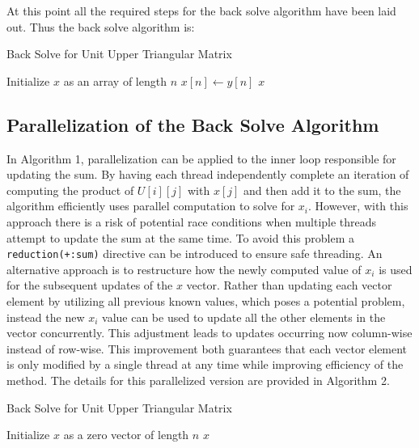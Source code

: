 \documentclass{article}
\begin{document}
\bigskip
\noindent
At this point all the required steps for the back solve algorithm have been laid out. Thus the back solve algorithm is:

\begin{algorithm}[hbt!]
\caption{Back Solve for Unit Upper Triangular Matrix}
\label{algo:back_substitution}
\SetAlgoLined
{}
Initialize $x$ as an array of length $n$\;
$x[n] \gets y[n]$ \;
\Return $x$\;
\end{algorithm}

\subsection{Parallelization of the Back Solve Algorithm}
In Algorithm 1, parallelization can be applied to the inner loop responsible for updating the sum. By having each thread independently complete an iteration of computing the product of \( U[i][j]\) with $x[j]$ and then add it to the sum, the algorithm efficiently uses parallel computation to solve for $x_{i}$. However, with this approach there is a risk of potential race conditions when multiple threads attempt to update the sum at the same time. To avoid this problem a \texttt{reduction(+:sum)} directive can be introduced to ensure safe threading. An alternative approach is to restructure how the newly computed value of $x_{i}$ is used for the subsequent updates of the \(x\) vector. Rather than updating each vector element by utilizing all previous known values, which poses a potential problem, instead the new $x_{i}$ value can be used to update all the other elements in the vector concurrently. This adjustment leads to updates occurring now column-wise instead of row-wise. This improvement both guarantees that each vector element is only modified by a single thread at any time while improving efficiency of the method. The details for this parallelized version are provided in Algorithm 2.
\clearpage

\begin{algorithm}[hbt!]
\caption{Back Solve for Unit Upper Triangular Matrix}
\label{algo:back_substitution}
\SetAlgoLined
{}
Initialize $x$ as a zero vector of length $n$\;
\Return $x$\;
\end{algorithm}
\end{document}
